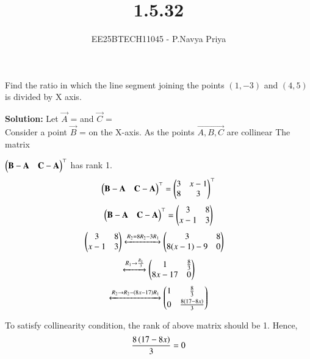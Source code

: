 \documentclass[journal,12pt,onecolumn]{IEEEtran}
\theoremstyle{remark}
\begin{document}
\title{1.5.32}
\author{EE25BTECH11045 - P.Navya Priya}
\maketitle
\renewcommand{\thefigure}{\theenumi}
\renewcommand{\thetable}{\theenumi}

\vspace{1cm}

 Find the ratio in which the line segment joining the points $(1,-3)$ and $(4,5)$ is divided
 by X axis.

\vspace{0.75cm}
\textbf{Solution:} Let $\vec{A}$ =  and $\vec{C}$ = \\[5pt]

Consider a point $\vec{B}$ =  on the X-axis.
As the points $\vec{A,B,C}$ are collinear
The matrix 

$\begin{pmatrix} \mathbf{B}-\mathbf{A} & \mathbf{C}-\mathbf{A} \end{pmatrix}^\top$ has rank 1.
\begin{align}
\begin{pmatrix} \mathbf{B}-\mathbf{A} & \mathbf{C}-\mathbf{A} \end{pmatrix}^\top = \begin{pmatrix}3&x-1\\8&3\end{pmatrix}^\top
\end{align}
\begin{align}
\begin{pmatrix} \mathbf{B}-\mathbf{A} & \mathbf{C}-\mathbf{A} \end{pmatrix}^\top = \begin{pmatrix}3&8\\x-1&3\end{pmatrix}
\end{align}
\begin{align}
\begin{pmatrix}3&8\\x-1&3\end{pmatrix}
 &\xleftrightarrow{R_2 = 8R_2 - 3R_1}
 \begin{pmatrix}3&8\\8(x-1)-9&0\end{pmatrix}
\end{align}
\begin{align}
\xleftrightarrow{R_{1}\rightarrow\frac{R_{1}}{3}}\begin{pmatrix}1&\frac{8}{3}\\8x-17&0\end{pmatrix}
\end{align}
\begin{align}
\xleftrightarrow{R_{2}\rightarrow R_{2}-\ensuremath{\left(8x-17\right)}R_{1}}\begin{pmatrix}1&\frac{8}{3}\\[3pt]0&\frac{8\left(17-8x\right)}{3}\end{pmatrix}
\end{align}

 To satisfy collinearity condition, the rank of above matrix should be 1. Hence,
\begin{align}
\frac{8\left(17-8x\right)}{3} = 0
\end{align}
\end{document}
